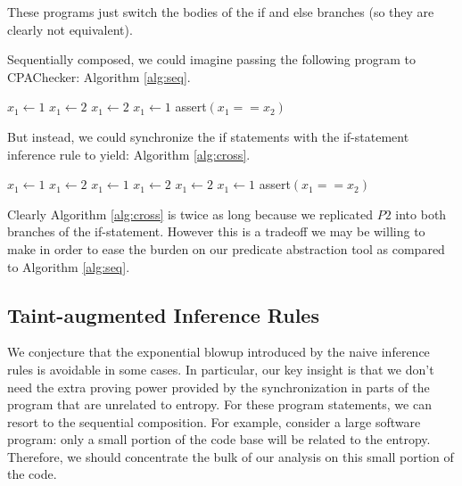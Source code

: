 \documentclass[letterpaper,twocolumn,10pt]{article}
\newcommand{\cross}{\otimes{}}
\begin{document}
These programs just switch the bodies of the if and else branches (so they are clearly not equivalent). 

Sequentially composed, we could imagine passing the following program to CPAChecker: Algorithm \ref{alg:seq}.

\begin{algorithm}
  \caption{$P1; P2$}
  \label{alg:seq}
  \begin{algorithmic}[1]
        \State $x_1 \gets 1$
    \Else
        \State $x_1 \gets 2$
    \EndIf
        \State $x_1 \gets 2$
    \Else
        \State $x_1 \gets 1$
    \EndIf
    \State \textsf{assert}$(x_1 == x_2)$
  \end{algorithmic}
\end{algorithm}

But instead, we could synchronize the if statements with the if-statement inference rule to yield: Algorithm \ref{alg:cross}.

\begin{algorithm}
  \caption{$P1{} \cross P2$}
  \label{alg:cross}
  \begin{algorithmic}[1]
        \State $x_1 \gets 1$
            \State $x_1 \gets 2$
        \Else
            \State $x_1 \gets 1$
        \EndIf
    \Else
        \State $x_1 \gets 2$
            \State $x_1 \gets 2$
        \Else
            \State $x_1 \gets 1$
        \EndIf
    \EndIf
    \State \textsf{assert}$(x_1 == x_2)$
  \end{algorithmic}
\end{algorithm}

Clearly Algorithm \ref{alg:cross} is twice as long because we replicated $P2$ into both branches of the if-statement. However this is a tradeoff we may be willing to make in order to ease the burden on our predicate abstraction tool as compared to Algorithm \ref{alg:seq}.

\subsection{Taint-augmented Inference Rules}
\label{sec:augpprules}

We conjecture that the exponential blowup introduced by the naive inference rules is avoidable in some cases. In particular, our key insight is that we don't need the extra proving power provided by the synchronization in parts of the program that are unrelated to entropy. For these program statements, we can resort to the sequential composition. For example, consider a large software program: only a small portion of the code base will be related to the entropy. Therefore, we should concentrate the bulk of our analysis on this small portion of the code. 
\end{document}
